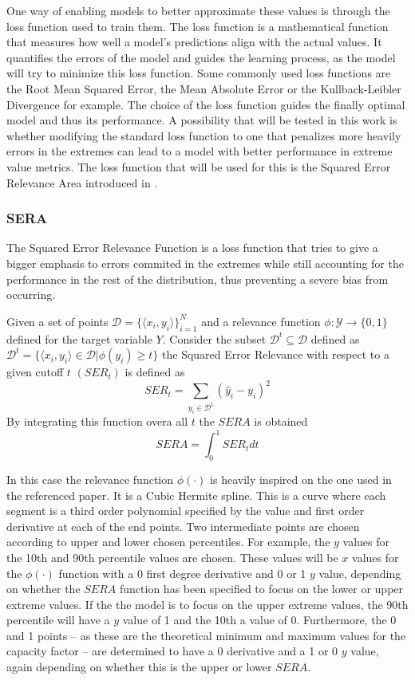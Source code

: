One way of enabling models to better approximate these values is through the loss function used to train them. The loss function is a mathematical function that measures how well a model's predictions align with the actual values. It quantifies the errors of the model and guides the learning process, as the model will try to minimize this loss function. Some commonly used loss functions are the Root Mean Squared Error, the Mean Absolute Error or the Kullback-Leibler Divergence for example. The choice of the loss function guides the finally optimal model and thus its performance. A possibility that will be tested in this work is whether modifying the standard loss function to one that penalizes more heavily errors in the extremes can lead to a model with better performance in extreme value metrics. The loss function that will be used for this is the Squared Error Relevance Area introduced in \cite{silva_ribeiro_moniz_2022}.
\subsubsection{SERA}
The Squared Error Relevance Function is a loss function that tries to give a bigger emphasis to errors commited in the extremes while still accounting for the performance in the rest of the distribution, thus preventing a severe bias from occurring. 

Given a set of points $\mathcal{D}=\{\langle x_i,y_i\rangle\}^N_{i=1}$ and a relevance function $\phi :\mathcal{Y} \rightarrow \{0,1\}$ defined for the target variable $Y$. Consider the subset $\mathcal{D}^t\subseteq \mathcal{D}$ defined as $\mathcal{D}^t=\{\langle x_i, y_i\rangle \in \mathcal{D} | \phi(y_i)\geq t\}$ the Squared Error Relevance with respect to a given cutoff $t$ $(SER_t)$ is defined as 
\begin{equation}
    SER_t=\sum_{y_i \in \mathcal{D}^t}(\hat{y}_i-y_i)^2
\end{equation}
By integrating this function overa all $t$ the $SERA$ is obtained
\begin{equation}
    SERA=\int_0^1 SER_t dt
\end{equation}

In this case the relevance function $\phi(\cdot)$ is heavily inspired on the one used in the referenced paper. It is a Cubic Hermite spline. This is a curve where each segment is a third order polynomial specified by the value and first order derivative at each of the end points. Two intermediate points are chosen according to upper and lower chosen percentiles. For example, the $y$ values for the 10th and 90th percentile values are chosen. These values will be $x$ values for the $\phi(\cdot)$ function with a 0 first degree derivative and 0 or 1 $y$ value, depending on whether the $SERA$ function has been specified to focus on the lower or upper extreme values. If the the model is to focus on the upper extreme values, the 90th percentile will have a $y$ value of 1 and the 10th a value of 0. Furthermore, the 0 and 1 points -- as these are the theoretical minimum and maximum values for the capacity factor -- are determined to have a 0 derivative and a 1 or 0 $y$ value, again depending on whether this is the upper or lower $SERA$. 

